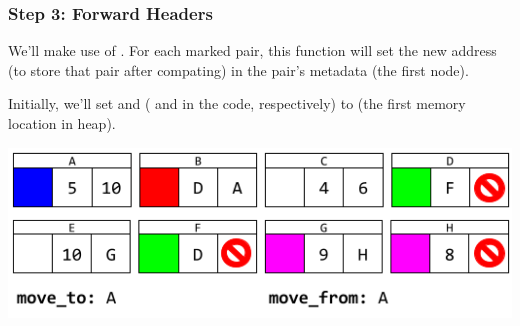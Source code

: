 \documentclass[letterpaper]{article}
\begin{document}
\subsubsection{Step 3: Forward Headers}
\begin{mdframed}
    We'll make use of . For each marked pair, this function will set the new address (to store that pair after compating) in the pair's metadata (the first node).
\end{mdframed}

Initially, we'll set  and  ( and  in the code, respectively) to  (the first memory location in heap).

\begin{center}
    \includegraphics[scale=0.6]{../assets/GCAlg3.png}
\end{center}
\end{document}
